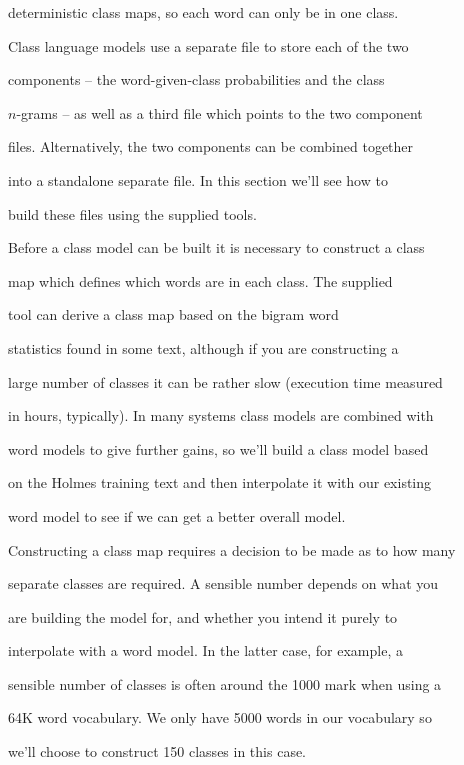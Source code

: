 deterministic class maps, so each word can only be in one class.


Class language models use a separate file to store each of the two


components -- the word-given-class probabilities and the class


$n$-grams -- as well as a third file which points to the two component


files.  Alternatively, the two components can be combined together


into a standalone separate file.  In this section we'll see how to


build these files using the supplied tools.





Before a class model can be built it is necessary to construct a class


map which defines which words are in each class.  The supplied


 tool can derive a class map based on the bigram word


statistics found in some text, although if you are constructing a


large number of classes it can be rather slow (execution time measured


in hours, typically).  In many systems class models are combined with


word models to give further gains, so we'll build a class model based


on the Holmes training text and then interpolate it with our existing


word model to see if we can get a better overall model.





Constructing a class map requires a decision to be made as to how many


separate classes are required.  A sensible number depends on what you


are building the model for, and whether you intend it purely to


interpolate with a word model.  In the latter case, for example, a


sensible number of classes is often around the 1000 mark when using a


64K word vocabulary.  We only have 5000 words in our vocabulary so


we'll choose to construct 150 classes in this case.





